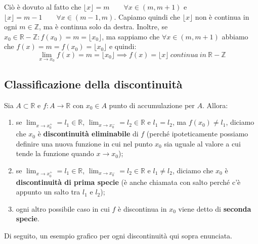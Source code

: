 \documentclass{article}
\begin{document}
\noindent Ciò è dovuto al fatto che $\lfloor x \rfloor = m \qquad \forall x \in (m, m + 1)$ e $\lfloor x \rfloor = m - 1 \qquad \forall x \in (m - 1, m)$. Capiamo quindi che $\lfloor x \rfloor$ non è continua in ogni $m \in \mathbb{Z}$, ma è continua solo da destra. Inoltre, se $x_0 \in \mathbb{R} - \mathbb{Z} : f(x_0) = m = \lfloor x_0 \rfloor$, ma sappiamo che $\forall x \in (m, m + 1)$ abbiamo che $f(x) = m = f(x_0) = \lfloor x_0 \rfloor$ e quindi:
\begin{equation*}
    \lim_{x \to x_0} f(x) = m = \lfloor x_0 \rfloor \implies f(x) = \lfloor x \rfloor \ continua \ in \ \mathbb{R} - \mathbb{Z}
\end{equation*}

\subsection{Classificazione della discontinuità}
Sia $A \subset \mathbb{R}$ e $f: A \xrightarrow{} \mathbb{R}$ con $x_0 \in A$ punto di accumulazione per $A$. Allora:
\begin{enumerate}
    \item se $\lim_{x \to x_0^+} = l_1 \in \mathbb{R}$, $\lim_{x \to x_0^-} = l_2 \in \mathbb{R}$ e $l_1 = l_2$, ma $f(x_0) \neq l_1$, diciamo che $x_0$ è \textbf{discontinuità eliminabile} di $f$ (perché ipoteticamente possiamo definire una nuova funzione in cui nel punto $x_0$ sia uguale al valore a cui tende la funzione quando $x \to x_0$);
    \item se $\lim_{x \to x_0^+} = l_1 \in \mathbb{R}$, $\lim_{x \to x_0^-} = l_2 \in \mathbb{R}$ e $l_1 \neq l_2$, diciamo che $x_0$ è \textbf{discontinuità di prima specie} (è anche chiamata con salto perché c'è appunto un salto tra $l_1$ e $l_2$);
    \item ogni altro possibile caso in cui $f$ è discontinua in $x_0$ viene detto di \textbf{seconda specie}.
\end{enumerate}

\noindent Di seguito, un esempio grafico per ogni discontinuità qui sopra enunciata.
\end{document}
